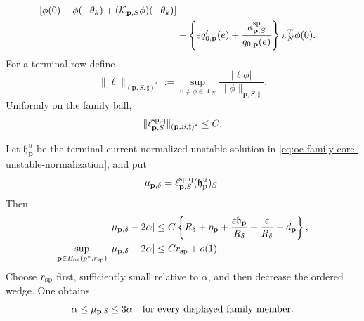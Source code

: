 \begin{theorem}
\begin{align}
 \left[\phi(0)-\phi(-\theta_k)
       +(\mathcal K_{\mathbf p,S}\phi)(-\theta_k)\right]\notag\\
&-\left\{\varepsilon q_{0,\mathbf p}'(e)
       +\frac{\kappa_{\mathbf p,S}^{\rm sp}}
                    {q_{0,\mathbf p}(e)}\right\}
       \pi_N^T\phi(0).                          \label{eq:oe-family-speed-expanded-row}
\end{align}
For a terminal row define
\begin{equation}
 \|\ell\|_{(\mathbf p,S,\sharp)^*}
 :=\sup_{0\ne\phi\in\mathscr X_N}
       \frac{|\ell\phi|}
            {\|\phi\|_{\mathbf p,S,\sharp}}.
                                                        \label{eq:oe-family-speed-dual-norm}
\end{equation}
Uniformly on the family ball,
\begin{equation}
 \|\ell_{\mathbf p,S}^{\rm sp,q}\|_
       {(\mathbf p,S,\sharp)^*}\le C.           \label{eq:oe-family-speed-row-bound}
\end{equation}

Let \(\mathfrak h_{\mathbf p}^u\) be the terminal-current-normalized
unstable solution in
\cref{eq:oe-family-core-unstable-normalization}, and put
\begin{equation}
 \mu_{\mathbf p,\delta}
 =\ell_{\mathbf p,S}^{\rm sp,q}
       (\mathfrak h_{\mathbf p}^u)_S.           \label{eq:oe-family-speed-unstable-coefficient}
\end{equation}
Then
\begin{align}
 |\mu_{\mathbf p,\delta}-2\alpha|
 &\le C\left\{
 R_\delta+\eta_{\mathbf p}
 +\frac{\varepsilon\mathfrak b_{\mathbf p}}{R_\delta}
 +\frac{\varepsilon}{R_\delta}
 +d_{\mathbf p}\right\},                       \label{eq:oe-family-speed-transversality}\\
 \sup_{\mathbf p\in B_{\rm oe}(p^\circ,r_{\rm sp})}
 |\mu_{\mathbf p,\delta}-2\alpha|
 &\le Cr_{\rm sp}+o(1).                        \label{eq:oe-family-speed-transversality-uniform}
\end{align}
Choose \(r_{\rm sp}\) first, sufficiently small relative to \(\alpha\),
and then decrease the ordered wedge.  One obtains
\begin{equation}
 \alpha\le\mu_{\mathbf p,\delta}\le3\alpha
 \quad\hbox{for every displayed family member}.             \label{eq:oe-family-speed-margin}
\end{equation}


\end{theorem}
